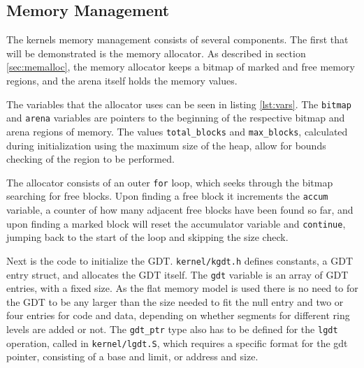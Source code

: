 \documentclass[10pt]{report}
\begin{document}


\subsection{Memory Management}
The kernels memory management consists of several components. The first that will be demonstrated is the memory allocator. As described in section \ref{sec:memalloc}, the memory allocator keeps a bitmap of marked and free memory regions, and the arena itself holds the memory values.



The variables that the allocator uses can be seen in listing \ref{lst:vars}. The \texttt{bitmap} and \texttt{arena} variables are pointers to the beginning of the respective bitmap and arena regions of memory. The values \texttt{total_blocks} and \texttt{max_blocks}, calculated during initialization using the maximum size of the heap, allow for bounds checking of the region to be performed. 



The allocator consists of an outer \texttt{for} loop, which seeks through the bitmap searching for free blocks. Upon finding a free block it increments the \texttt{accum} variable, a counter of how many adjacent free blocks have been found so far, and upon finding a marked block will reset the accumulator variable and \texttt{continue}, jumping back to the start of the loop and skipping the size check.


Next is the code to initialize the GDT. \texttt{kernel/kgdt.h} defines constants, a GDT entry struct, and allocates the GDT itself. The \texttt{gdt} variable is an array of GDT entries, with a fixed size. As the flat memory model is used there is no need to for the GDT to be any larger than the size needed to fit the null entry and two or four entries for code and data, depending on whether segments for different ring levels are added or not. The \texttt{gdt_ptr} type also has to be defined for the \texttt{lgdt} operation, called in \texttt{kernel/lgdt.S}, which requires a specific format for the gdt pointer, consisting of a base and limit, or address and size.
\end{document}
